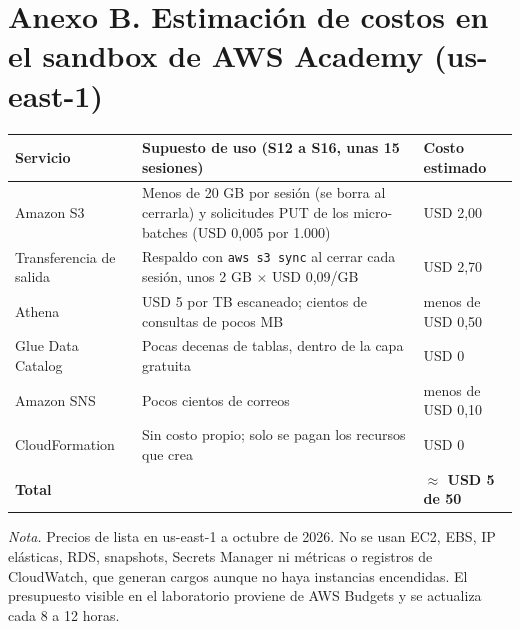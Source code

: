 \documentclass[12pt,letterpaper]{article}
\newcommand{\code}[1]{{\small\texttt{#1}}}
\begin{document}
\section*{Anexo B. Estimación de costos en el sandbox de AWS Academy (us-east-1)}
\begin{footnotesize}
\begin{tabular}{@{}P{1.55in}P{3.3in}P{1.45in}@{}}
\toprule
\textbf{Servicio} & \textbf{Supuesto de uso (S12 a S16, unas 15 sesiones)} & \textbf{Costo estimado}\\
\midrule
Amazon S3 & Menos de 20 GB por sesión (se borra al cerrarla) y solicitudes PUT de los micro-batches (USD 0,005 por 1.000) & USD 2,00\\
Transferencia de salida & Respaldo con \code{aws s3 sync} al cerrar cada sesión, unos 2 GB $\times$ USD 0,09/GB & USD 2,70\\
Athena & USD 5 por TB escaneado; cientos de consultas de pocos MB & menos de USD 0,50\\
Glue Data Catalog & Pocas decenas de tablas, dentro de la capa gratuita & USD 0\\
Amazon SNS & Pocos cientos de correos & menos de USD 0,10\\
CloudFormation & Sin costo propio; solo se pagan los recursos que crea & USD 0\\
\midrule
\textbf{Total} & & \textbf{$\approx$ USD 5 de 50}\\
\bottomrule
\end{tabular}

\vspace{3pt}
\noindent\emph{Nota.} Precios de lista en us-east-1 a octubre de 2026. No se usan EC2, EBS, IP elásticas, RDS, snapshots, Secrets Manager ni métricas o registros de CloudWatch, que generan cargos aunque no haya instancias encendidas. El presupuesto visible en el laboratorio proviene de AWS Budgets y se actualiza cada 8 a 12 horas.
\end{footnotesize}
\end{document}
